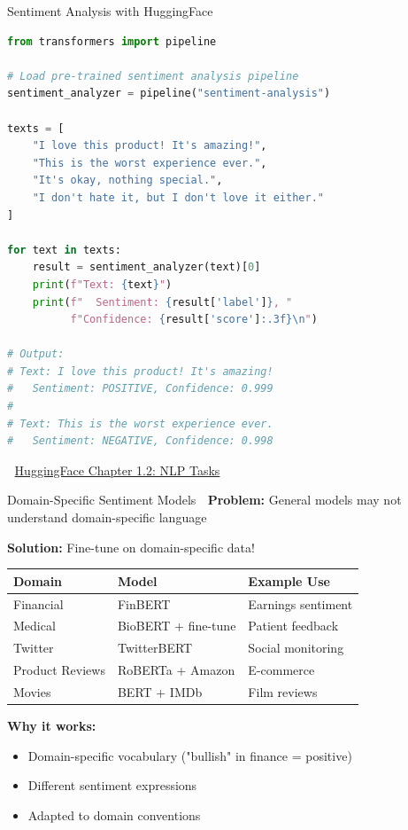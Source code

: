 \documentclass[aspectratio=169]{beamer}
\begin{document}
\begin{frame}[fragile]{Sentiment Analysis with HuggingFace 🤗}
    \begin{lstlisting}[language=Python]
from transformers import pipeline

# Load pre-trained sentiment analysis pipeline
sentiment_analyzer = pipeline("sentiment-analysis")

texts = [
    "I love this product! It's amazing!",
    "This is the worst experience ever.",
    "It's okay, nothing special.",
    "I don't hate it, but I don't love it either."
]

for text in texts:
    result = sentiment_analyzer(text)[0]
    print(f"Text: {text}")
    print(f"  Sentiment: {result['label']}, "
          f"Confidence: {result['score']:.3f}\n")

# Output:
# Text: I love this product! It's amazing!
#   Sentiment: POSITIVE, Confidence: 0.999
#
# Text: This is the worst experience ever.
#   Sentiment: NEGATIVE, Confidence: 0.998
    \end{lstlisting}

    📖 \href{https://huggingface.co/learn/nlp-course/chapter1/2}{HuggingFace Chapter 1.2: NLP Tasks}
\end{frame}

\begin{frame}{Domain-Specific Sentiment Models 🎯}
    \textbf{Problem:} General models may not understand domain-specific language

    \vspace{0.5em}
    \textbf{Solution:} Fine-tune on domain-specific data!

    \vspace{0.5em}
    \begin{table}
        \centering
        \small
        \begin{tabular}{lll}
            \toprule
            \textbf{Domain} & \textbf{Model} & \textbf{Example Use} \\
            \midrule
            Financial & FinBERT & Earnings sentiment \\
            Medical & BioBERT + fine-tune & Patient feedback \\
            Twitter & TwitterBERT & Social monitoring \\
            Product Reviews & RoBERTa + Amazon & E-commerce \\
            Movies & BERT + IMDb & Film reviews \\
            \bottomrule
        \end{tabular}
    \end{table}

    \vspace{0.5em}
    \textbf{Why it works:}
    \begin{itemize}\setlength{\itemsep}{0pt}
        \item Domain-specific vocabulary ("bullish" in finance = positive)
        \item Different sentiment expressions
        \item Adapted to domain conventions
    \end{itemize}
\end{frame}
\end{document}
